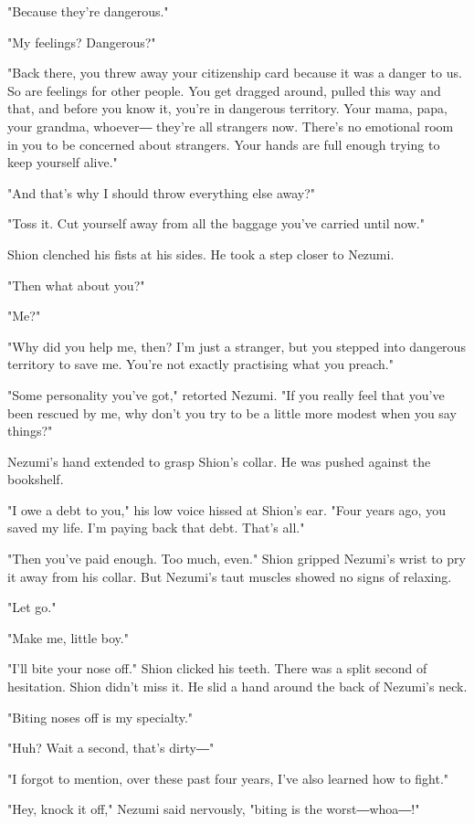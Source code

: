 "Because they're dangerous."

"My feelings? Dangerous?"

"Back there, you threw away your citizenship card because it was a
danger to us. So are feelings for other people. You get dragged around,
pulled this way and that, and before you know it, you're in dangerous
territory. Your mama, papa, your grandma, whoever― they're all strangers
now. There's no emotional room in you to be concerned about strangers.
Your hands are full enough trying to keep yourself alive."

"And that's why I should throw everything else away?"

"Toss it. Cut yourself away from all the baggage you've carried until
now."

Shion clenched his fists at his sides. He took a step closer to Nezumi.

"Then what about you?"

"Me?"

"Why did you help me, then? I'm just a stranger, but you stepped into
dangerous territory to save me. You're not exactly practising what you
preach."

"Some personality you've got," retorted Nezumi. "If you really feel that
you've been rescued by me, why don't you try to be a little more modest
when you say things?"

Nezumi's hand extended to grasp Shion's collar. He was pushed against
the bookshelf.

"I owe a debt to you," his low voice hissed at Shion's ear. "Four years
ago, you saved my life. I'm paying back that debt. That's all."

"Then you've paid enough. Too much, even." Shion gripped Nezumi's wrist
to pry it away from his collar. But Nezumi's taut muscles showed no
signs of relaxing.

"Let go."

"Make me, little boy."

"I'll bite your nose off." Shion clicked his teeth. There was a split
second of hesitation. Shion didn't miss it. He slid a hand around the
back of Nezumi's neck.

"Biting noses off is my specialty."

"Huh? Wait a second, that's dirty―"

"I forgot to mention, over these past four years, I've also learned how
to fight."

"Hey, knock it off," Nezumi said nervously, "biting is the worst―whoa―!"


